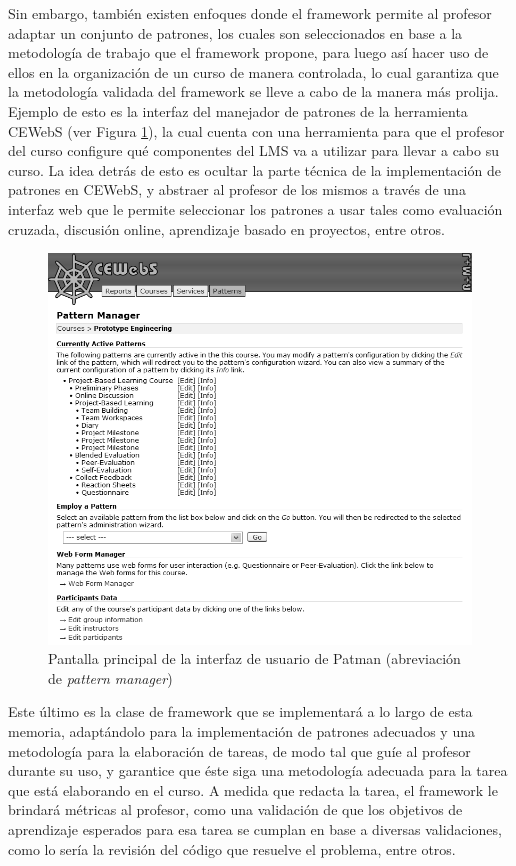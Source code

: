 \documentclass[letterpaper,12pt]{article}
\begin{document}
Sin embargo, también existen enfoques donde el framework permite al profesor adaptar un conjunto de patrones, los cuales son seleccionados en base a la metodología de trabajo que el framework propone, para luego así hacer uso de ellos en la organización de un curso de manera controlada, lo cual garantiza que la metodología validada del framework se lleve a cabo de la manera más prolija. Ejemplo de esto es la interfaz del manejador de patrones de la herramienta CEWebS \cite{elearn} (ver Figura \ref{ceweb}), la cual cuenta con una herramienta para que el profesor del curso configure qué componentes del LMS va a utilizar para llevar a cabo su curso. La idea detrás de esto es ocultar la parte técnica de la implementación de patrones en CEWebS, y abstraer al profesor de los mismos a través de una interfaz web que le permite seleccionar los patrones a usar tales como evaluación cruzada, discusión online, aprendizaje basado en proyectos, entre otros.

\begin{figure}[H]
  \centering
  \includegraphics[width=1\textwidth]{ceweb.png}
  \caption{Pantalla principal de la interfaz de usuario de Patman (abreviación de \textit{pattern manager}) \cite{elearn}}
  \label{ceweb}
\end{figure}

Este último es la clase de framework que se implementará a lo largo de esta memoria, adaptándolo para la implementación de patrones adecuados y una metodología para la elaboración de tareas, de modo tal que guíe al profesor durante su uso, y garantice que éste siga una metodología adecuada para la tarea que está elaborando en el curso. A medida que redacta la tarea, el framework le brindará métricas al profesor, como una validación de que los objetivos de aprendizaje esperados para esa tarea se cumplan en base a diversas validaciones, como lo sería la revisión del código que resuelve el problema, entre otros.
\end{document}
